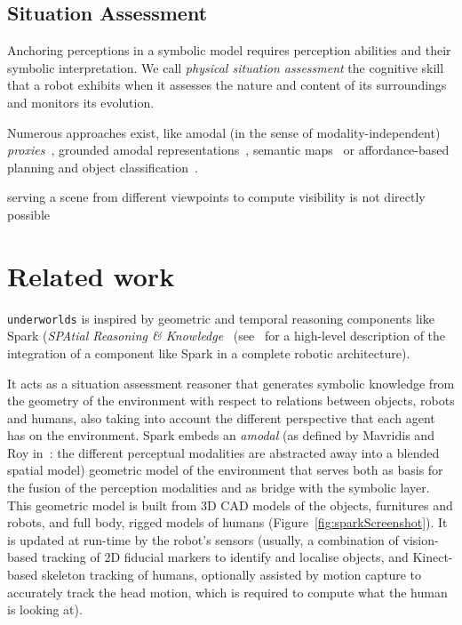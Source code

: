 \documentclass[letterpaper, 10 pt, conference]{ieeeconf}  %
\newcommand{\uwds}{{\tt underworlds}\xspace}
\begin{document}
\subsection{Situation Assessment}

Anchoring perceptions in a symbolic model requires perception abilities and
their symbolic interpretation. We call \emph{physical situation assessment} the
cognitive skill that a robot exhibits when it assesses the nature and content of its
surroundings and monitors its evolution.

Numerous approaches exist, like amodal (in the sense of modality-independent)
\emph{proxies}~\cite{Jacobsson2008}, grounded amodal
representations~\cite{Mavridis2006}, semantic
maps~\cite{Nuechter2008, Galindo2008,Blodow2011} or affordance-based planning
and object classification~\cite{Lorken2008, Varadarajan2011}.

serving a scene from
different viewpoints to compute visibility is not directly possible


\section{Related work}


\cite{sisbot2011situation}
\cite{naef2003blue}
\cite{bustos2016unified}

\uwds is inspired by geometric and temporal reasoning components like {\sc
Spark} (\emph{SPAtial Reasoning \&
Knowledge}~\cite{sisbot2011situation} (see~\cite{lemaignan2016artificial} for a
high-level description of the integration of a component like {\sc Spark} in a
complete robotic architecture).

It acts as a situation assessment reasoner that generates symbolic knowledge from the
geometry of the environment with respect to relations between objects, robots
and humans, also
taking into account the different perspective that each agent has on the
environment.  {\sc Spark} embeds an \emph{amodal} (as defined by Mavridis and
Roy in~\cite{Mavridis2006}: the different perceptual modalities are abstracted
away into a blended spatial model) geometric model of the environment that
serves both as basis for the fusion of the perception modalities and as bridge
with the symbolic layer. This geometric model is built from 3D CAD models of the
objects, furnitures and robots, and full body, rigged models of humans
(Figure~\ref{fig:sparkScreenshot}).  It is updated at run-time by the robot's
sensors (usually, a combination of vision-based tracking of 2D fiducial markers
to identify and localise objects, and Kinect-based skeleton tracking of humans,
optionally assisted by motion capture to accurately track the head motion, which
is required to compute what the human is looking at).
\end{document}
